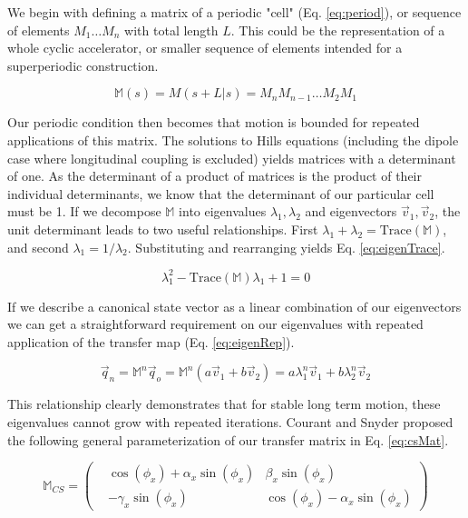 We begin with defining a matrix of a periodic "cell" (Eq. \ref{eq:period}), or sequence of elements $M_1 \dots M_n$ with total length $L$. This could be the representation of a whole cyclic accelerator, or smaller sequence of elements intended for a superperiodic construction.

\begin{equation} \label{eq:period}
	\mathbb{M}(s) = M(s+L|s) = M_nM_{n-1}\dots M_2M_1
\end{equation}

Our periodic condition then becomes that motion is bounded for repeated applications of this matrix. The solutions to Hills equations (including the dipole case where longitudinal coupling is excluded) yields matrices with a determinant of one. As the determinant of a product of matrices is the product of their individual determinants, we know that the determinant of our particular cell must be 1. If we decompose $\mathbb{M}$ into eigenvalues $\lambda_1, \lambda_2$ and eigenvectors $\vec{v}_1, \vec{v}_2$, the unit determinant leads to two useful relationships. First $\lambda_1 + \lambda_2 = \mathrm{Trace}(\mathbb{M})$, and second $\lambda_1 = 1/\lambda_2$. Substituting and rearranging yields Eq. \ref{eq:eigenTrace}.

\begin{equation} \label{eq:eigenTrace}
	\lambda_1^2 - \mathrm{Trace}(\mathbb{M})\lambda_1 + 1 = 0
\end{equation}

If we describe a canonical state vector as a linear combination of our eigenvectors we can get a straightforward requirement on our eigenvalues with repeated application of the transfer map (Eq. \ref{eq:eigenRep}).

\begin{equation} \label{eq:eigenRep}
	\vec{q}_n = \mathbb{M}^n\vec{q}_o = \mathbb{M}^n(a \vec{v}_1 + b \vec{v}_2) = a \lambda_1^n \vec{v}_1 + b \lambda_2^n \vec{v}_2
\end{equation}

This relationship clearly demonstrates that for stable long term motion, these eigenvalues cannot grow with repeated iterations. Courant and Snyder proposed the following general parameterization of our transfer matrix in Eq. \ref{eq:csMat}.

\begin{equation} \label{eq:csMat}
	\mathbb{M}_{CS} = 
\begin{pmatrix}
&\cos{\left(\phi_x\right)} + \alpha_x\sin{\left(\phi_x\right)} &\beta_x\sin{\left(\phi_x\right)}\\
&-\gamma_x\sin{\left(\phi_x\right)} &\cos{\left(\phi_x\right)} - \alpha_x\sin{\left(\phi_x\right)}\end{pmatrix}
\end{equation}

